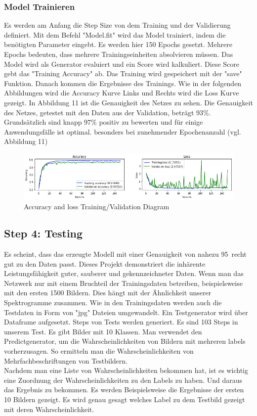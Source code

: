 \documentclass[a4paper,11pt]{article}
\theoremstyle{mytheor}
\begin{document}
\subsubsection{Model Trainieren}
Es werden am Anfang die Step Size von dem Training und der Validierung definiert. Mit dem Befehl "Model.fit" wird das Model trainiert, indem die benötigten Parameter eingebt. Es werden hier 150 Epochs gesetzt. Mehrere Epochs bedeuten, dass mehrere Trainingseinheiten absolvieren müssen. Das Model wird als Generator evaluiert und ein Score wird kalkuliert. Diese Score gebt das "Training Accuracy" ab. Das Training wird gespeichert mit der "save" Funktion. Danach kommen die Ergebnisse des Trainings. Wie in der folgenden Abbildungen wird die Accuracy Kurve Links und Rechts wird die Loss Kurve gezeigt. In Abbildung 11 ist die Genauigkeit des Netzes zu sehen. Die Genauigkeit des Netzes,
getestet mit den Daten aus der Validation, beträgt 93\%. Grundsätzlich sind knapp 97\% positiv
zu bewerten und für einige Anwendungsfälle ist optimal.
besonders bei zunehmender Epochenanzahl (vgl. Abbildung 11)
\begin{figure}
	\includegraphics[width=1\textwidth]{rechts.png}
	\caption [Accuracy and loss Training/Validation Diagram] {Accuracy and loss Training/Validation Diagram}
\end{figure}


\subsection{Step 4: Testing}
Es scheint, dass das erzeugte Modell mit einer Genauigkeit von nahezu 95\ recht gut zu den Daten passt. Dieses Projekt demonstriert die inhärente Leistungsfähigkeit guter, sauberer und gekennzeichneter Daten. Wenn man das Netzwerk nur mit einem Bruchteil der Trainingsdaten betreiben, beispielsweise mit den ersten 1500 Bildern. Dies hängt mit der Ähnlichkeit unserer Spektrogramme zusammen.
Wie in den Trainingsdaten werden auch die Testdaten in Form von "jpg" Dateien umgewandelt. 
Ein Testgenerator wird über Dataframe aufgesetzt. Steps von Tests werden generiert. Es sind 103 Steps in unserem Test. Es gibt Bilder mit 10 Klassen. Man verwendet den Predictgenerator, um die Wahrscheinlichkeiten von Bildern mit mehreren labels vorherzusagen. So ermitteln man die Wahrscheinlichkeiten von Mehrfachbeschriftungen von Testbildern.\\
Nachdem man eine Liste von Wahrscheinlichkeiten bekommen hat, ist es wichtig eine Zuordnung der Wahrscheinlichkeiten zu den Labels zu haben. Und daraus das Ergebnis zu bekommen. Es werden Beispielsweise die Ergebnisse der ersten 10 Bildern gezeigt. Es wird genau gesagt welches Label zu dem Testbild gezeigt mit deren Wahrscheinlichkeit.
\end{document}
